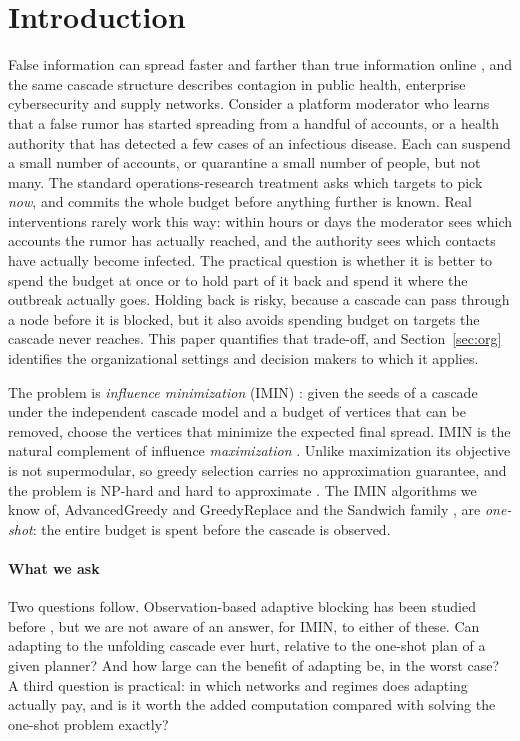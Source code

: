 \documentclass[preprint,11pt]{elsarticle}
\theoremstyle{definition}
\theoremstyle{remark}
\begin{document}
\section{Introduction}\label{sec:intro}

False information can spread faster and farther than true information online \citep{vosoughi2018,lazer2018}, and the same cascade structure describes contagion in public health, enterprise cybersecurity and supply networks. Consider a platform moderator who learns that a false rumor has started spreading from a handful of accounts, or a health authority that has detected a few cases of an infectious disease. Each can suspend a small number of accounts, or quarantine a small number of people, but not many. The standard operations-research treatment asks which targets to pick \emph{now}, and commits the whole budget before anything further is known. Real interventions rarely work this way: within hours or days the moderator sees which accounts the rumor has actually reached, and the authority sees which contacts have actually become infected. The practical question is whether it is better to spend the budget at once or to hold part of it back and spend it where the outbreak actually goes. Holding back is risky, because a cascade can pass through a node before it is blocked, but it also avoids spending budget on targets the cascade never reaches. This paper quantifies that trade-off, and Section~\ref{sec:org} identifies the organizational settings and decision makers to which it applies.

The problem is \emph{influence minimization} (IMIN) \citep{xie2023,xie2024}: given the seeds of a cascade under the independent cascade model and a budget of vertices that can be removed, choose the vertices that minimize the expected final spread. IMIN is the natural complement of influence \emph{maximization} \citep{kempe2003}. Unlike maximization its objective is not supermodular, so greedy selection carries no approximation guarantee, and the problem is NP-hard and hard to approximate \citep{xie2023}. The IMIN algorithms we know of, AdvancedGreedy and GreedyReplace \citep{xie2023,xie2024} and the Sandwich family \citep{wang2024sandwich}, are \emph{one-shot}: the entire budget is spent before the cascade is observed.

\paragraph{What we ask} Two questions follow. Observation-based adaptive blocking has been studied before \citep{shi2019}, but we are not aware of an answer, for IMIN, to either of these. Can adapting to the unfolding cascade ever hurt, relative to the one-shot plan of a given planner? And how large can the benefit of adapting be, in the worst case? A third question is practical: in which networks and regimes does adapting actually pay, and is it worth the added computation compared with solving the one-shot problem exactly?
\end{document}
